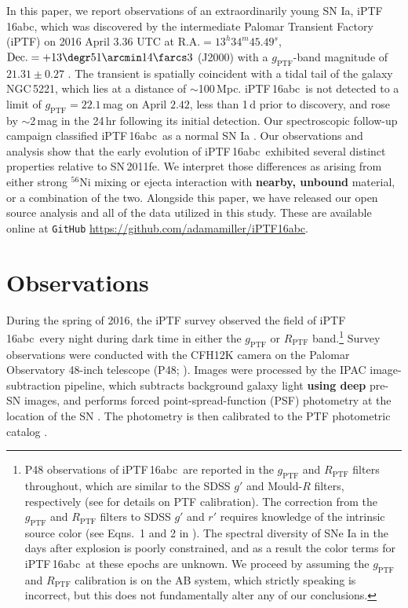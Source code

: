\documentclass[twocolumn]{aastex61}
\newcommand{\abc}{iPTF\,16abc}
\begin{document}
In this paper, we report observations of an extraordinarily young SN Ia, \abc,
which was discovered by the intermediate Palomar Transient Factory (iPTF) on
2016 April $3.36$ UTC at $\textrm{R.A.}=13^h34^m45.49^s$,
$\textrm{Dec.}=+13\degr51\arcmin14\farcs3$ (J2000) with a
$g_\mathrm{PTF}$-band magnitude of $21.31\pm0.27$ \citep{2016ATel.8907....1M}.
The transient is spatially coincident with a tidal tail of the galaxy
NGC\,5221, which lies at a distance of $\sim$100\,Mpc. \abc\ is not detected
to a limit of $g_\mathrm{PTF}=22.1$\,mag on April $2.42$, less than 1\,d prior
to discovery, and rose by $\sim$2\,mag in the 24\,hr following its initial
detection. Our spectroscopic follow-up campaign classified \abc\ as a normal
SN Ia \citep{2016ATel.8909....1C}. Our observations and analysis show that the
early evolution of \abc\ exhibited several distinct properties relative to
SN\,2011fe. We interpret those differences as arising from either strong
$^{56}$Ni mixing or ejecta interaction with \textbf{nearby, unbound} material,
or a combination of the two. Alongside this paper, we have released our open
source analysis and all of the data utilized in this study. These are
available online at \texttt{GitHub}
\url{https://github.com/adamamiller/iPTF16abc}.



\section{Observations}
\label{sec:obs}

During the spring of 2016, the iPTF survey observed the field of \abc\ every
night during dark time in either the $g_\mathrm{PTF}$ or $R_\mathrm{PTF}$
band.\footnote{P48 observations of \abc\ are reported in the $g_\mathrm{PTF}$
and $R_\mathrm{PTF}$ filters throughout, which are similar to the SDSS $g'$
and Mould-$R$ filters, respectively (see \citealt{2012PASP..124..854O} for
details on PTF calibration). The correction from the $g_\mathrm{PTF}$ and
$R_\mathrm{PTF}$ filters to SDSS $g'$ and $r'$ requires knowledge of the
intrinsic source color (see Eqns.~1 and 2 in \citealt{2012PASP..124..854O}).
The spectral diversity of SNe Ia in the days after explosion is poorly
constrained, and as a result the color terms for \abc\ at these epochs are
unknown. We proceed by assuming the $g_\mathrm{PTF}$ and $R_\mathrm{PTF}$
calibration is on the AB system, which strictly speaking is incorrect, but
this does not fundamentally alter any of our conclusions.} Survey observations
were conducted with the CFH12K camera \citep{2008SPIE.7014E..4YR} on the
Palomar Observatory 48-inch telescope (P48; \citealt{2009PASP..121.1395L}).
Images were processed by the IPAC image-subtraction pipeline, which subtracts
background galaxy light \textbf{using deep} pre-SN images, and performs forced
point-spread-function (PSF) photometry at the location of the SN
\citep{2017PASP..129a4002M}. The photometry is then calibrated to the PTF
photometric catalog \citep{2012PASP..124..854O}.
\end{document}
